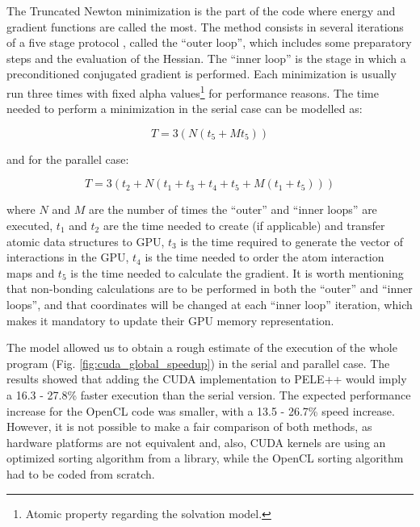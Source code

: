 The Truncated Newton minimization is the part of the code where energy and gradient functions are called the most. The
method consists in several iterations of a five stage protocol \cite{xie_remark_1999}, called the ``outer
loop'', which includes some preparatory steps and the evaluation of the Hessian. The ``inner loop'' is the stage in
which a preconditioned conjugated gradient is performed. Each minimization is usually run three times with fixed alpha
values\footnote{Atomic property regarding the solvation model.} for performance reasons. The time needed to perform a
minimization in the serial case can be modelled as:

\begin{equation}
T = 3 (N (t_5 + M t_5))
\end{equation}

and for the parallel case:

\begin{equation}
T = 3 (t_2 + N (t_1 + t_3 +t_4 +t_5 + M (t_1 +t_5 )))
\end{equation}

where $N$ and $M$ are the number of times the ``outer'' and ``inner loops'' are executed, $t_1$ and $t_2$ are
the time needed to create (if applicable) and transfer atomic data structures to GPU, $t_3$ is the time required to
generate the vector of interactions in the GPU, $t_4$ is the time needed to order the atom interaction maps and
$t_5$ is the time needed to calculate the gradient. It is worth mentioning that non-bonding calculations are to be
performed in both the ``outer'' and ``inner loops'', and that coordinates will be changed at each ``inner loop''
iteration, which makes it mandatory to update their GPU memory representation. 

The model allowed us to obtain a rough estimate of the execution of the whole program (Fig.
\ref{fig:cuda_global_speedup}) in the serial and parallel case. The results showed that adding the
CUDA implementation to PELE++ would imply a 16.3 - 27.8\% faster execution than the serial version. The expected
performance increase for the OpenCL code was smaller, with a 13.5 - 26.7\% speed increase. However, it is not possible
to make a fair comparison of both methods, as hardware platforms are not equivalent and, also, CUDA kernels are
using an optimized sorting algorithm from a library, while the OpenCL sorting algorithm had to be coded from scratch.

